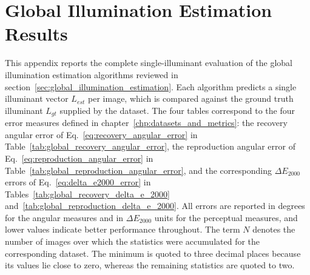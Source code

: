 \section{Global Illumination Estimation Results}
\label{sec:appendix_global_results}

This appendix reports the complete single-illuminant evaluation of the global illumination estimation algorithms reviewed in section~\ref{sec:global_illumination_estimation}. Each algorithm predicts a single illuminant vector $L_{est}$ per image, which is compared against the ground truth illuminant $L_{gt}$ supplied by the dataset. The four tables correspond to the four error measures defined in chapter~\ref{chp:datasets_and_metrics}: the recovery angular error of Eq.~\ref{eq:recovery_angular_error} in Table~\ref{tab:global_recovery_angular_error}, the reproduction angular error of Eq.~\ref{eq:reproduction_angular_error} in Table~\ref{tab:global_reproduction_angular_error}, and the corresponding $\Delta E_{2000}$ errors of Eq.~\ref{eq:delta_e2000_error} in Tables~\ref{tab:global_recovery_delta_e_2000} and~\ref{tab:global_reproduction_delta_e_2000}. All errors are reported in degrees for the angular measures and in $\Delta E_{2000}$ units for the perceptual measures, and lower values indicate better performance throughout. The term $N$ denotes the number of images over which the statistics were accumulated for the corresponding dataset. The minimum is quoted to three decimal places because its values lie close to zero, whereas the remaining statistics are quoted to two.

